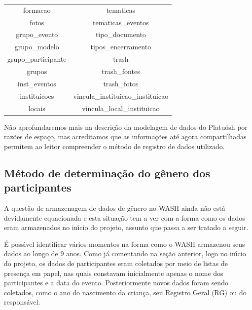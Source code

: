 \documentclass[
12pt,		%
openright,	%
twoside,  %
a4paper,			%
chapter=TITLE,		%
english,			%
french,				%
spanish,			%
brazil				%
]{USPSC-classe/USPSC}
\begin{document}
\begin{table}[htb]
\begin{tabular}{|c|c|}
 formacao                       &   tematicas \\
 fotos                          &   tematicas\_eventos \\
 grupo\_evento                   &   tipo\_documento \\
 grupo\_modelo                   &   tipos\_encerramento \\
 grupo\_participante             &   trash \\
 grupos                         &   trash\_fontes \\
 inst\_eventos                   &   trash\_fotos \\
 instituicoes                   &   vincula\_instituicao\_instituicao \\
 locais                         &   vincula\_local\_instituicao \\
\hline
\end{tabular}
\end{table}


N\~ao aprofundaremos mais na descri\c{c}\~ao da modelagem de dados do Platu\'osh por raz\~oes de espa\c{c}o, mas acreditamos que as informa\c{c}\~oes at\'e agora compartilhadas permitem ao leitor compreender o m\'etodo de registro de dados utilizado.










\subsection[M\'etodo de determina\c{c}\~ao do g\^enero dos participantes]{M\'etodo de determina\c{c}\~ao do g\^enero dos participantes}\label{M\'etodo de determina\c{c}\~ao do g\^enero dos participantes}
A quest\~ao de armazenagem de dados de g\^enero no WASH ainda n\~ao est\'a devidamente equacionada e esta situa\c{c}\~ao tem a ver com a forma como os dados eram armazenados no in\'{\i}cio do projeto, assunto que passa a ser tratado a seguir.










\'E poss\'{\i}vel identificar v\'arios momentos na forma como o WASH armazenou seus dados ao longo de 9 anos. Como j\'a comentando na se\c{c}\~ao anterior, logo no in\'{\i}cio do projeto, os dados de participantes eram coletados por meio de listas de presen\c{c}a em papel, nas quais constavam inicialmente apenas o nome dos participantes e a data do evento. Posteriormente novos dados foram sendo coletados, como o ano do nascimento da crian\c{c}a, seu Registro Geral (RG) ou do respons\'avel.
\end{document}
